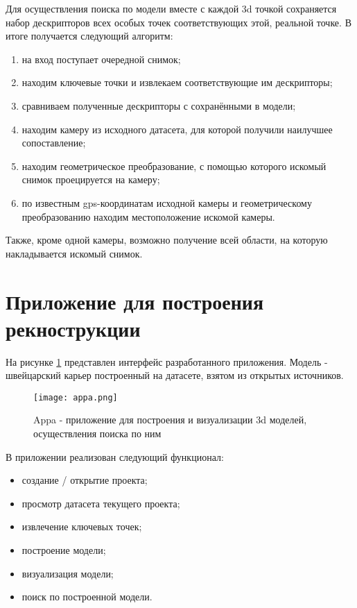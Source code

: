 Для осуществления поиска по модели вместе с каждой 3d точкой сохраняется набор дескрипторов всех особых точек соответствующих этой, реальной точке. В итоге получается следующий алгоритм:

\begin{enumerate}
    \item на вход поступает очередной снимок;
    \item находим ключевые точки и извлекаем соответствующие им дескрипторы;
    \item сравниваем полученные дескрипторы с сохранёнными в модели;
    \item находим камеру из исходного датасета, для которой получили наилучшее сопоставление;
    \item находим геометрическое преобразование, с помощью которого искомый снимок проецируется на  камеру;
    \item по известным gps-координатам исходной камеры и геометрическому преобразованию находим местоположение искомой камеры.
\end{enumerate}

Также, кроме одной камеры, возможно получение всей области, на которую накладывается искомый снимок.

\section{Приложение для построения рекнострукции}

На рисунке \ref{fig:appa} представлен интерфейс разработанного приложения. Модель - швейцарский карьер построенный на датасете, взятом из открытых источников.

\begin{figure}[h]
    \centering
    \texttt{[image: appa.png]}
    \caption{Appa - приложение для построения и визуализации 3d моделей, осуществления поиска по ним}
    \label{fig:appa}
\end{figure}

В приложении реализован следующий функционал:

\begin{itemize}
    \item создание / открытие проекта;
    \item просмотр датасета текущего проекта;
    \item извлечение ключевых точек;
    \item построение модели;
    \item визуализация модели;
    \item поиск по построенной модели.
\end{itemize}

